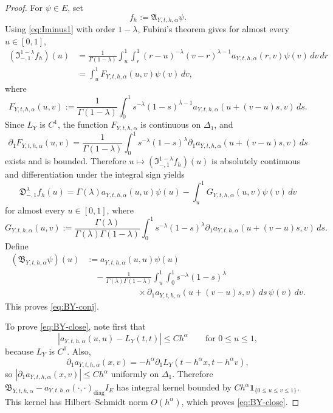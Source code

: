 \documentclass[11pt,a4paper]{amsart}
\theoremstyle{plain}
\theoremstyle{definition}
\theoremstyle{remark}
\newcommand{\one}{\mathbf 1}
\begin{document}
\begin{proof}
For \(\psi\in E\), set
\[
f_h:=\mathfrak A_{Y,t,h,\alpha}\psi.
\]
Using \eqref{eq:Iminus1} with order \(1-\lambda\), Fubini's theorem gives for almost every
\(u\in[0,1]\),
\begin{align*}
(\mathfrak I_{-,1}^{1-\lambda}f_h)(u)
&=
\frac{1}{\Gamma(1-\lambda)}
\int_u^1\int_r^1
(r-u)^{-\lambda}(v-r)^{\lambda-1}
a_{Y,t,h,\alpha}(r,v)\psi(v)\,dv\,dr \\
&=
\int_u^1 F_{Y,t,h,\alpha}(u,v)\psi(v)\,dv,
\end{align*}
where
\[
F_{Y,t,h,\alpha}(u,v)
:=
\frac{1}{\Gamma(1-\lambda)}
\int_0^1 s^{-\lambda}(1-s)^{\lambda-1}
a_{Y,t,h,\alpha}(u+(v-u)s,v)\,ds.
\]
Since \(L_Y\) is \(C^1\), the function \(F_{Y,t,h,\alpha}\) is continuous on \(\Delta_1\), and
\[
\partial_1F_{Y,t,h,\alpha}(u,v)
=
\frac{1}{\Gamma(1-\lambda)}
\int_0^1 s^{-\lambda}(1-s)^\lambda
\partial_1 a_{Y,t,h,\alpha}(u+(v-u)s,v)\,ds
\]
exists and is bounded. Therefore \(u\mapsto (\mathfrak I_{-,1}^{1-\lambda}f_h)(u)\) is
absolutely continuous and differentiation under the integral sign yields
\[
\mathfrak D_{-,1}^{\lambda}f_h(u)
=
\Gamma(\lambda)a_{Y,t,h,\alpha}(u,u)\psi(u)
-\int_u^1 G_{Y,t,h,\alpha}(u,v)\psi(v)\,dv
\]
for almost every \(u\in[0,1]\), where
\[
G_{Y,t,h,\alpha}(u,v)
:=
\frac{\Gamma(\lambda)}{\Gamma(\lambda)\Gamma(1-\lambda)}
\int_0^1 s^{-\lambda}(1-s)^\lambda
\partial_1 a_{Y,t,h,\alpha}(u+(v-u)s,v)\,ds.
\]
Define
\[
\begin{aligned}
(\mathfrak B_{Y,t,h,\alpha}\psi)(u)
&:=
a_{Y,t,h,\alpha}(u,u)\psi(u) \\
&\quad
-\frac{1}{\Gamma(\lambda)\Gamma(1-\lambda)}
\int_u^1\int_0^1 s^{-\lambda}(1-s)^\lambda \\
&\qquad\qquad\qquad \times
\partial_1 a_{Y,t,h,\alpha}(u+(v-u)s,v)\,ds\,\psi(v)\,dv.
\end{aligned}
\]
This proves \eqref{eq:BY-conj}.

To prove \eqref{eq:BY-close}, note first that
\[
|a_{Y,t,h,\alpha}(u,u)-L_Y(t,t)|\le Ch^\alpha
\qquad\text{for }0\le u\le 1,
\]
because \(L_Y\) is \(C^1\). Also,
\[
\partial_1 a_{Y,t,h,\alpha}(x,v)
=
-h^\alpha \partial_1L_Y(t-h^\alpha x,t-h^\alpha v),
\]
so \(|\partial_1 a_{Y,t,h,\alpha}(x,v)|\le Ch^\alpha\) uniformly on \(\Delta_1\). Therefore
\(\mathfrak B_{Y,t,h,\alpha}-a_{Y,t,h,\alpha}(\cdot,\cdot)_{\mathrm{diag}}I_E\) has integral
kernel bounded by \(Ch^\alpha\one_{\{0\le u\le v\le 1\}}\). This kernel has Hilbert--Schmidt norm
\(O(h^\alpha)\), which proves \eqref{eq:BY-close}.
\end{proof}
\end{document}
